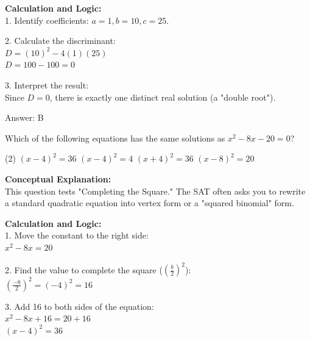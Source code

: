 \documentclass[11pt,paper=a4,answers]{exam}
\begin{document}
\begin{questions}
\begin{solution}
\vspace{15pt}

\textbf{Calculation and Logic:} \\
1. Identify coefficients: $a = 1, b = 10, c = 25$.

\vspace{10pt}

2. Calculate the discriminant: \\
   $D = (10)^2 - 4(1)(25)$ \\
   $D = 100 - 100 = 0$

\vspace{10pt}

3. Interpret the result: \\
   Since $D = 0$, there is exactly one distinct real solution (a "double root").

\vspace{20pt}

Answer: \colorbox{yellow!100}{B}
\end{solution}

\question
Which of the following equations has the same solutions as $x^2 - 8x - 20 = 0$?
\begin{tasks}(2)
    \task $(x - 4)^2 = 36$
    \task $(x - 4)^2 = 4$
    \task $(x + 4)^2 = 36$
    \task $(x - 8)^2 = 20$
\end{tasks}

\begin{solution}
\textbf{Conceptual Explanation:} \\
This question tests "Completing the Square." The SAT often asks you to rewrite a standard quadratic equation into vertex form or a "squared binomial" form.

\vspace{15pt}

\textbf{Calculation and Logic:} \\
1. Move the constant to the right side: \\
   $x^2 - 8x = 20$

\vspace{10pt}

2. Find the value to complete the square ($(\frac{b}{2})^2$): \\
   $(\frac{-8}{2})^2 = (-4)^2 = 16$

\vspace{10pt}

3. Add 16 to both sides of the equation: \\
   $x^2 - 8x + 16 = 20 + 16$ \\
   $(x - 4)^2 = 36$


\end{solution}
\end{questions}
\end{document}

